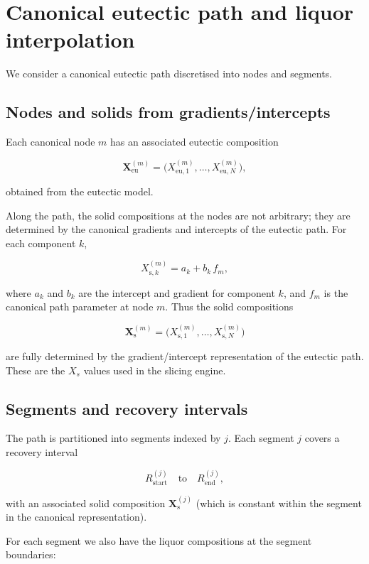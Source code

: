 \section*{Canonical eutectic path and liquor interpolation}

We consider a canonical eutectic path discretised into nodes and segments.

\subsection*{Nodes and solids from gradients/intercepts}

Each canonical node \(m\) has an associated eutectic composition


\[
\mathbf{X}^{(m)}_{\mathrm{eu}} = \bigl(X^{(m)}_{\mathrm{eu},1}, \dots, X^{(m)}_{\mathrm{eu},N}\bigr),
\]


obtained from the eutectic model.

Along the path, the solid compositions at the nodes are not arbitrary;
they are determined by the canonical gradients and intercepts of the
eutectic path. For each component \(k\),


\[
X^{(m)}_{\mathrm{s},k}
= a_k + b_k \, f_m,
\]


where \(a_k\) and \(b_k\) are the intercept and gradient for component \(k\),
and \(f_m\) is the canonical path parameter at node \(m\).
Thus the solid compositions


\[
\mathbf{X}^{(m)}_{\mathrm{s}} = \bigl(X^{(m)}_{\mathrm{s},1}, \dots, X^{(m)}_{\mathrm{s},N}\bigr)
\]


are fully determined by the gradient/intercept representation of the
eutectic path. These are the \(X_s\) values used in the slicing engine.

\subsection*{Segments and recovery intervals}

The path is partitioned into segments indexed by \(j\).
Each segment \(j\) covers a recovery interval


\[
R^{(j)}_{\mathrm{start}} \quad \text{to} \quad R^{(j)}_{\mathrm{end}},
\]


with an associated solid composition \(\mathbf{X}^{(j)}_{\mathrm{s}}\)
(which is constant within the segment in the canonical representation).

For each segment we also have the liquor compositions at the segment
boundaries:


